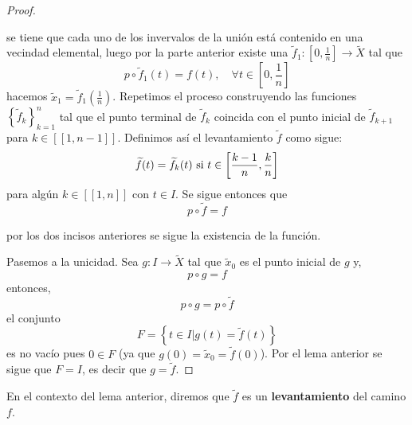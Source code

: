 \documentclass[12pt]{report}
\theoremstyle{largebreak}
\newcommand\cf[3]{\ensuremath{#1:#2\rightarrow#3}}
\newcommand\natint[1]{\ensuremath{\left[\!\left[ #1\right]\!\right]}}
\begin{document}
\begin{proof}
\begin{itemize}
            se tiene que cada uno de los invervalos de la unión está contenido en una vecindad elemental, luego por la parte anterior existe una $\cf{\widetilde{f}_1}{\left[0,\frac{1}{n} \right]}{\widetilde{X}}$ tal que
            \begin{equation*}
                p\circ\widetilde{f}_1(t)=f(t),\quad\forall t\in\left[0,\frac{1}{n} \right]
            \end{equation*}
            hacemos $\widetilde{x}_1=\widetilde{f}_1\left(\frac{1}{n}\right)$. Repetimos el proceso construyendo las funciones $\left\{\widetilde{f}_k \right\}_{ k=1}^n$ tal que el punto terminal de $\widetilde{f}_k$ coincida con el punto inicial de $\widetilde{f}_{ k+1}$ para $k\in\natint{1,n-1}$. Definimos así el levantamiento $\widetilde{f}$ como sigue:
            \begin{equation*}
                \widetilde{f}(t)=\widetilde{f}_k(t)\textup{ si }t\in\left[\frac{k-1}{n},\frac{k}{n} \right]
            \end{equation*}
            para algún $k\in\natint{1,n}$ con $t\in I$. Se sigue entonces que
            \begin{equation*}
                p\circ\widetilde{f}=f
            \end{equation*}
        \end{itemize}
        por los dos incisos anteriores se sigue la existencia de la función.

        Pasemos a la unicidad. Sea $\cf{g}{I}{\widetilde{X}}$ tal que $\widetilde{x}_0$ es el punto inicial de $g$ y,
        \begin{equation*}
            p\circ g=f
        \end{equation*}
        entonces,
        \begin{equation*}
            p\circ g=p\circ \widetilde{f}
        \end{equation*}
        el conjunto
        \begin{equation*}
            F=\left\{t\in I\Big|g(t)=\widetilde{f}(t) \right\}
        \end{equation*}
        es no vacío pues $0\in F$ (ya que $g(0)=\widetilde{x}_0=\widetilde{f}(0)$). Por el lema anterior se sigue que $F=I$, es decir que $g=\widetilde{f}$.
    \end{proof}

    \begin{mydef}
        En el contexto del lema anterior, diremos que $\widetilde{f}$ es un \textbf{levantamiento} del camino $f$.
    \end{mydef}
\end{document}
